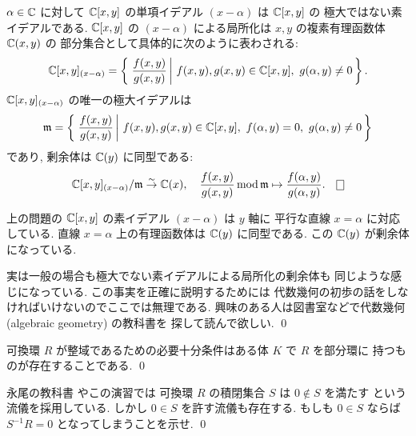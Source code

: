 \documentclass[12pt,twoside]{jarticle}
\begin{document}
\begin{question}
 $\alpha\in{\mathbb C}$ に対して %
 ${\mathbb C}[x,y]$ の単項イデアル $(x-\alpha)$ は ${\mathbb C}[x,y]$ の
 極大ではない素イデアルである.
 ${\mathbb C}[x,y]$ の $(x-\alpha)$ による局所化は $x,y$ の複素有理函数体 ${\mathbb C}(x,y)$ の
 部分集合として具体的に次のように表わされる:
 \begin{equation*}
  {\mathbb C}[x,y]_{(x-\alpha)} =
   \left\{\,\left. \frac{f(x,y)}{g(x,y)} 
   \,\right|\, f(x,y),g(x,y)\in{\mathbb C}[x,y],\ g(\alpha,y)\ne 0 \,\right\}.
 \end{equation*}
 ${\mathbb C}[x,y]_{(x-\alpha)}$ の唯一の極大イデアルは
 \begin{equation*}
  \frakm =
   \left\{\,\left. \frac{f(x,y)}{g(x,y)} 
   \,\right|\, f(x,y),g(x,y)\in\C[x,y],\ %
   f(\alpha,y)=0,\ g(\alpha,y)\ne 0 \,\right\}
 \end{equation*}
 であり, 剰余体は ${\mathbb C}(y)$ に同型である:
 \begin{equation*}
  \C[x,y]_{(x-\alpha)}/\frakm \isomto \C(x),
  \quad
  \frac{f(x,y)}{g(x,y)} \MOD \frakm \mapsto \frac{f(\alpha,y)}{g(\alpha,y)}.
  \qed
 \end{equation*}
\end{question}

\begin{guide}
 上の問題の ${\mathbb C}[x,y]$ の素イデアル $(x-\alpha)$ は $y$ 軸に
 平行な直線 $x=\alpha$ に対応している. 
 直線 $x=\alpha$ 上の有理函数体は ${\mathbb C}(y)$ に同型である.
 この ${\mathbb C}(y)$ が剰余体になっている.

 実は一般の場合も極大でない素イデアルによる局所化の剰余体も
 同じような感じになっている.
 この事実を正確に説明するためには
 代数幾何の初歩の話をしなければいけないのでここでは無理である.
 興味のある人は図書室などで代数幾何 (algebraic geometry) の教科書を
 探して読んで欲しい.
 \qed
\end{guide}

\begin{question}[整域の商体への埋め込み, 簡単]
 可換環 $R$ が整域であるための必要十分条件はある体 $K$ で $R$ を部分環に
 持つものが存在することである.
 \qed
\end{question}

\begin{question}[積閉集合が零元を含むことを許した場合, 簡単]
 永尾の教科書 \cite{nagao-1983} やこの演習では
 可換環 $R$ の積閉集合 $S$ は $0\not\in S$ を満たす
 という流儀を採用している.
 しかし $0\in S$ を許す流儀も存在する.
 もしも $0\in S$ ならば $S^{-1}R=0$ となってしまうことを示せ.
 \qed
\end{question}
\end{document}
